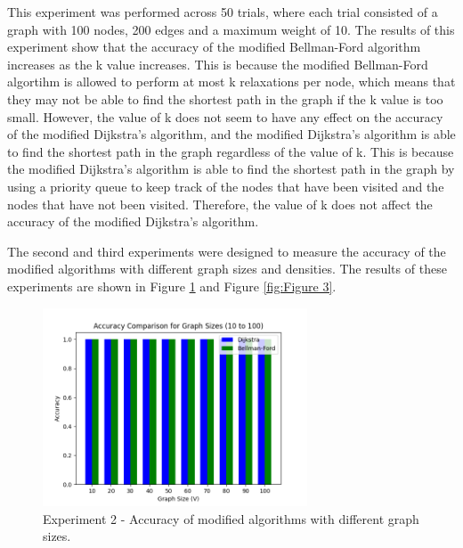 \documentclass[12pt]{article}
\begin{document}
This experiment was performed across 50 trials, where each trial consisted of a graph with 100 nodes, 200 edges and a maximum weight of 10. 
The results of this experiment show that the accuracy of the modified Bellman-Ford algorithm increases as the k value increases. This is because the modified Bellman-Ford algortihm is allowed to perform at most k relaxations per node, which means that they may not be able to find the shortest path in the graph if the k value is too small.
\smallskip
\newline
\indent However, the value of k does not seem to have any effect on the accuracy of the modified Dijkstra's algorithm, and the modified Dijkstra's algorithm is able to find the shortest path in the graph regardless of the value of k. This is because the modified Dijkstra's algorithm is able to find the shortest path in the graph by using a priority queue to keep track of the nodes that have been visited and the nodes that have not been visited.
Therefore, the value of k does not affect the accuracy of the modified Dijkstra's algorithm.
\smallskip
\newline

\indent The second and third experiments were designed to measure the accuracy of the modified algorithms with different graph sizes and densities. The results of these experiments are shown in Figure \ref{fig:Figure 2} and Figure \ref{fig:Figure 3}.

\begin{figure}[H] 
    \centering
    \includegraphics[width=0.7\textwidth]{Figures/Accuracy_sizes.png} 
    \caption{\footnotesize Experiment 2 - Accuracy of modified algorithms with different graph sizes.}
    \label{fig:Figure 2} 
\end{figure}
\end{document}
